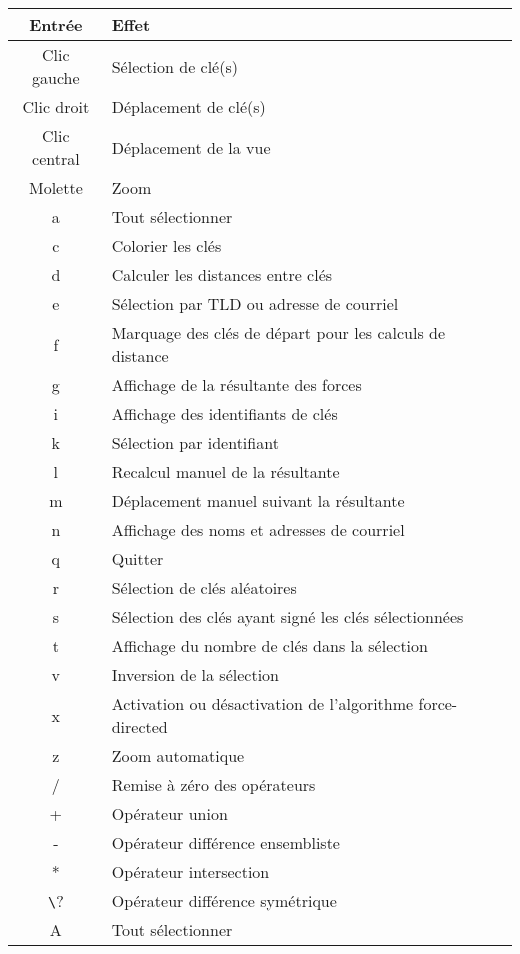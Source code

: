 \documentclass[a4paper]{article}
\begin{document}
\begin{table}[p]
\centering
\begin{tabular}{|c|l|}
\hline {\bf Entrée} & {\bf Effet} \\
\hline Clic gauche & Sélection de clé(s) \\
\hline Clic droit & Déplacement de clé(s) \\
\hline Clic central & Déplacement de la vue \\
\hline Molette & Zoom \\
\hline a & Tout sélectionner \\
\hline c & Colorier les clés \\
\hline d & Calculer les distances entre clés \\
\hline e & Sélection par TLD ou adresse de courriel \\
\hline f & Marquage des clés de départ pour les calculs de distance \\
\hline g & Affichage de la résultante des forces \\
\hline i & Affichage des identifiants de clés \\
\hline k & Sélection par identifiant \\
\hline l & Recalcul manuel de la résultante \\
\hline m & Déplacement manuel suivant la résultante \\
\hline n & Affichage des noms et adresses de courriel \\
\hline q & Quitter \\
\hline r & Sélection de clés aléatoires \\
\hline s & Sélection des clés ayant signé les clés sélectionnées \\
\hline t & Affichage du nombre de clés dans la sélection \\
\hline v & Inversion de la sélection \\
\hline x & Activation ou désactivation de l'algorithme force-directed \\
\hline z & Zoom automatique \\
\hline / & Remise à zéro des opérateurs \\
\hline + & Opérateur union \\
\hline - & Opérateur différence ensembliste \\
\hline * & Opérateur intersection \\
\hline \verb?\? & Opérateur différence symétrique \\
\hline A & Tout sélectionner \\

\end{tabular}
\end{table}
\end{document}
